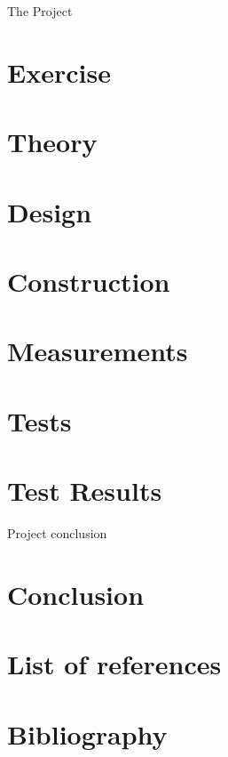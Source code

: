 \documentclass{report}
\begin{document}
  \begin{chapter}{The Project}
    \lipsum[3-6]
    \clearpage

    \section{Exercise}
    \lipsum[2-8]
    \clearpage

    \section{Theory}
    \lipsum[3-12]
    \clearpage

    \section{Design}
    \lipsum[1-5]
    \clearpage

    \section{Construction}
    \lipsum[3-4]
    \clearpage

    \section{Measurements}
    \lipsum[3-5]
    \clearpage

    \section{Tests}
    \lipsum[1-9]
    \clearpage

    \section{Test Results}
    \lipsum[5-10]
    \clearpage
  \end{chapter}

  \begin{chapter}{Project conclusion}
    \section{Conclusion}
    \lipsum[3-5]
    \clearpage

    \section{List of references}
    \lipsum[3-5]
    \clearpage

    \section{Bibliography}
    \lipsum[3-5]
    \clearpage
  \end{chapter}
\end{document}
